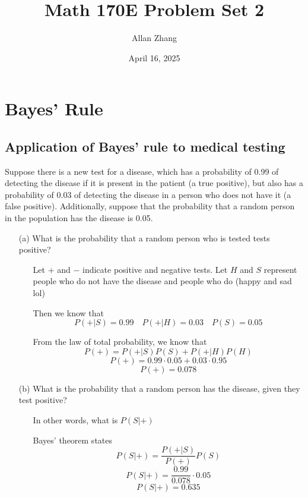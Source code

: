\documentclass[hidelinks]{article}
\title{\textbf{Math 170E Problem Set 2}}
\author{Allan Zhang}
\date{April 16, 2025}
\begin{document}
\hypersetup{bookmarksnumbered=true,}
\pagecolor{white}
\color{black}
\maketitle 
\section{Bayes' Rule}
\subsection{Application of Bayes’ rule to medical testing}
Suppose there is a new test for a disease, which has a probability of 0.99 of detecting the
disease if it is present in the patient (a true positive), but also has a probability of 0.03
of detecting the disease in a person who does not have it (a false positive). Additionally,
suppose that the probability that a random person in the population has the disease is 0.05.
\begin{itemize}
    \item[(a)]  What is the probability that a random person who is tested tests positive?
    \begin{itemize}
        \item[ ] Let + and $-$ indicate positive and negative tests. Let $H$ and $S$ represent people who do not have the disease and people who do (happy and sad lol)
        \item[ ] Then we know that
        \[
            P(+|S) = 0.99 \quad P(+|H) = 0.03 \quad P(S)=0.05 
        \]
    \item[ ] From the law of total probability, we know that  
        \[
            P(+) = P(+|S)P(S) + P(+|H)P(H) 
        \]
        \[
            P(+) = 0.99\cdot 0.05 + 0.03 \cdot 0.95
        \]
        \[
            P(+) = 0.078
        \]
    \end{itemize}
    \item[(b)] What is the probability that a random person has the disease, given they test positive?
    \begin{itemize}
        \item[ ] In other words, what is $P(S|+)$
        \item[ ] Bayes' theorem states 
        \[
            P(S|+) = \frac{P(+|S)}{P(+)}P(S)
        \]
        \[
            P(S|+) = \frac{0.99}{0.078}\cdot 0.05
        \]
        \[
            P(S|+) = 0.635
        \]
    \end{itemize}
\end{itemize}
\newpage
\end{document}
